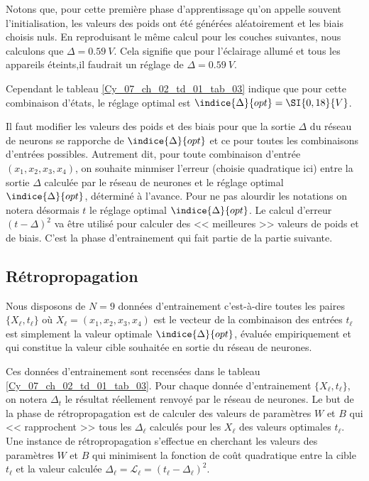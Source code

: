 Notons que, pour cette première phase d'apprentissage qu'on appelle souvent l'initialisation, les valeurs des poids ont été générées aléatoirement et les biais choisis nuls. En reproduisant le même calcul pour les couches suivantes, nous calculons que $\Delta= \SI{0,59}{V}$. Cela signifie que pour l'éclairage allumé et tous les appareils éteints,il faudrait un réglage de $\Delta= \SI{0,59}{V}$.

Cependant le tableau \ref{Cy_07_ch_02_td_01_tab_03} indique que pour cette combinaison d'états, le réglage optimal est $\indice{\Delta}{opt} = \SI{0,18}{V}$.

Il faut modifier les valeurs des poids et des biais pour que la sortie $\Delta$ du réseau de neurons se rapporche de $\indice{\Delta}{opt}$ et ce pour toutes les combinaisons d'entrées possibles. Autrement dit, pour toute combinaison d'entrée $\left(x_1, x_2, x_3, x_4 \right)$, on souhaite minmiser l'erreur (choisie quadratique ici) entre la sortie $\Delta$ calculée par le réseau de neurones et le réglage optimal $\indice{\Delta}{opt}$, déterminé à l'avance. 
Pour ne pas alourdir les notations on notera désormais $t$ le réglage optimal $\indice{\Delta}{opt}$. Le calcul d'erreur $(t-\Delta)^2$ va être utilisé pour calculer des << meilleures >> valeurs de poids et de biais. C'est la phase d'entrainement qui fait partie de la partie suivante.


\subsection*{Rétropropagation }
Nous disposons de $N=9$ données d'entrainement c'est-à-dire toutes les paires $\{ X_{\ell},t_{\ell}\}$ où 
$X_{\ell} = \left(x_1, x_2, x_3, x_4 \right)$ est le vecteur de la combinaison des entrées $t_{\ell}$ est simplement la valeur optimale $\indice{\Delta}{opt}$, évaluée empiriquement et qui constitue la valeur cible souhaitée en sortie du réseau de neurones.
 
 Ces données d'entrainement sont recensées dans le tableau \ref{Cy_07_ch_02_td_01_tab_03}. Pour chaque donnée d'entrainement  $\{ X_{\ell},t_{\ell}\}$, on notera $\Delta_t$ le résultat réellement renvoyé par le réseau de neurones. Le but de la phase de rétropropagation est de calculer des valeurs de paramètres 
 $W$ et $B$ qui << rapprochent >> tous les $\Delta_{\ell}$ calculés pour les $X_{\ell}$ des valeurs optimales 
 $t_{\ell}$. Une instance de rétropropagation s'effectue en cherchant les valeurs des paramètres $W$ et $B$ qui minimisent la fonction de coût quadratique entre la cible  $t_{\ell}$ et la valeur calculée 
 $\Delta_{\ell} = \mathcal{L}_{\ell} = \left(t_{\ell} - \Delta_{\ell}\right)^2$.
 
